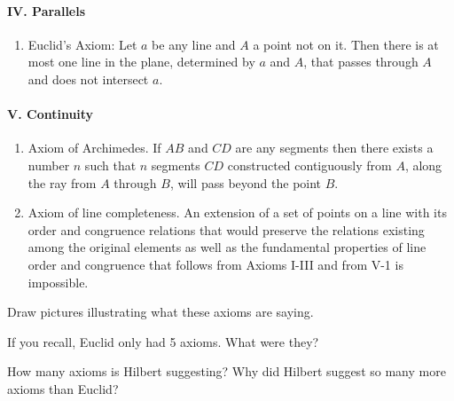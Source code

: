\documentclass{ximera}
\begin{document}
\paragraph{IV. Parallels}

\begin{enumerate}

\item Euclid's Axiom: Let $a$ be any line and $A$ a point not on
  it. Then there is at most one line in the plane, determined by $a$ and
  $A$, that passes through $A$ and does not intersect $a$.
\end{enumerate}

\paragraph{V. Continuity}

\begin{enumerate}
\item Axiom of Archimedes. If $AB$ and $CD$ are any segments then there
  exists a number $n$ such that $n$ segments $CD$ constructed contiguously
  from $A$, along the ray from $A$ through $B$, will pass beyond the point
  $B$.

\item Axiom of line completeness. An extension of a set of points on a
  line with its order and congruence relations that would preserve the
  relations existing among the original elements as well as the
  fundamental properties of line order and congruence that follows
  from Axioms I-III and from V-1 is impossible.
\end{enumerate}


\begin{exploration}
Draw pictures illustrating what these axioms are saying.
\end{exploration}


\begin{question}
If you recall, Euclid only had 5 axioms. What were they?
\end{question}

\begin{question}
How many axioms is Hilbert suggesting? Why did Hilbert suggest so many more axioms than Euclid? 
\end{question}
\end{document}
